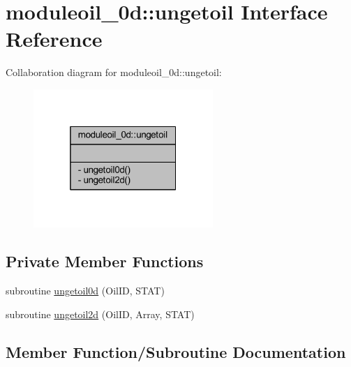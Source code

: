 \hypertarget{interfacemoduleoil__0d_1_1ungetoil}{}\section{moduleoil\+\_\+0d\+:\+:ungetoil Interface Reference}
\label{interfacemoduleoil__0d_1_1ungetoil}


Collaboration diagram for moduleoil\+\_\+0d\+:\+:ungetoil\+:\nopagebreak
\begin{figure}[H]
\begin{center}
\leavevmode
\includegraphics[width=193pt]{interfacemoduleoil__0d_1_1ungetoil__coll__graph}
\end{center}
\end{figure}
\subsection*{Private Member Functions}
\begin{DoxyCompactItemize}
\item 
subroutine \mbox{\hyperlink{interfacemoduleoil__0d_1_1ungetoil_a9162c1148d65275c408c0d6ff61ed297}{ungetoil0d}} (Oil\+ID, S\+T\+AT)
\item 
subroutine \mbox{\hyperlink{interfacemoduleoil__0d_1_1ungetoil_adcaec318ceb5457ef272230145efed2f}{ungetoil2d}} (Oil\+ID, Array, S\+T\+AT)
\end{DoxyCompactItemize}


\subsection{Member Function/\+Subroutine Documentation}
\mbox{\label{interfacemoduleoil__0d_1_1ungetoil_a9162c1148d65275c408c0d6ff61ed297}} 
